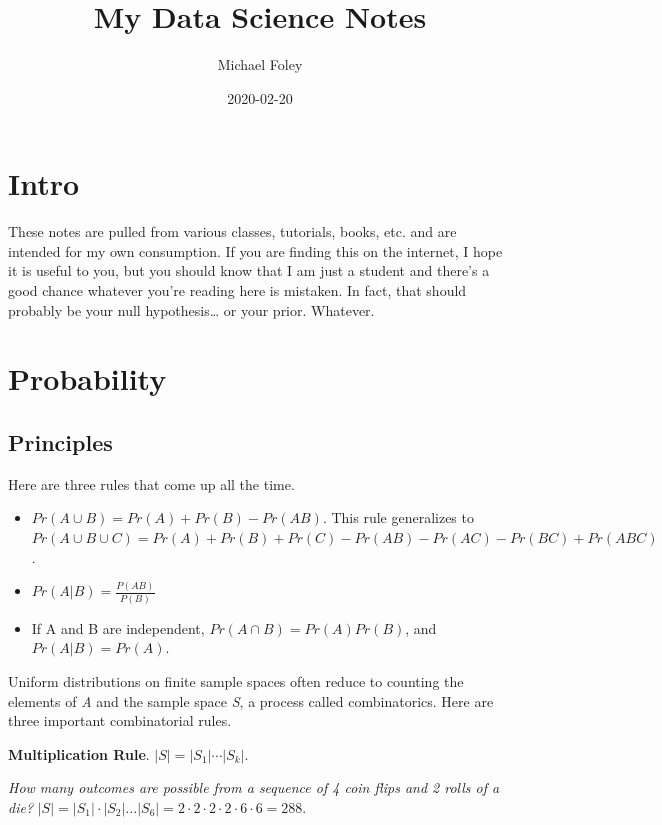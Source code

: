 \documentclass[
]{book}
\title{My Data Science Notes}
\author{Michael Foley}
\date{2020-02-20}
\begin{document}
\maketitle

{
\setcounter{tocdepth}{1}
\tableofcontents
}
\hypertarget{intro}{%
\chapter*{Intro}\label{intro}}

These notes are pulled from various classes, tutorials, books, etc. and are intended for my own consumption. If you are finding this on the internet, I hope it is useful to you, but you should know that I am just a student and there's a good chance whatever you're reading here is mistaken. In fact, that should probably be your null hypothesis\ldots{} or your prior. Whatever.

\hypertarget{probability}{%
\chapter{Probability}\label{probability}}

\hypertarget{principles}{%
\section{Principles}\label{principles}}

Here are three rules that come up all the time.

\begin{itemize}
\item
  \(Pr(A \cup B) = Pr(A)+Pr(B) - Pr(AB)\). This rule generalizes to
  \(Pr(A \cup B \cup C)=Pr(A)+Pr(B)+Pr(C)-Pr(AB)-Pr(AC)-Pr(BC)+Pr(ABC)\).
\item
  \(Pr(A|B) = \frac{P(AB)}{P(B)}\)
\item
  If A and B are independent, \(Pr(A \cap B) = Pr(A)Pr(B)\), and \(Pr(A|B)=Pr(A)\).
\end{itemize}

Uniform distributions on finite sample spaces often reduce to counting the elements of \emph{A} and the sample space \emph{S}, a process called combinatorics. Here are three important combinatorial rules.

\textbf{Multiplication Rule}. \(|S|=|S_1 |⋯|S_k|\).

\emph{How many outcomes are possible from a sequence of 4 coin flips and 2 rolls of a die?}
\(|S|=|S_1| \cdot |S_2| \dots |S_6| = 2 \cdot 2 \cdot 2 \cdot 2 \cdot 6 \cdot 6 = 288\).
\end{document}
